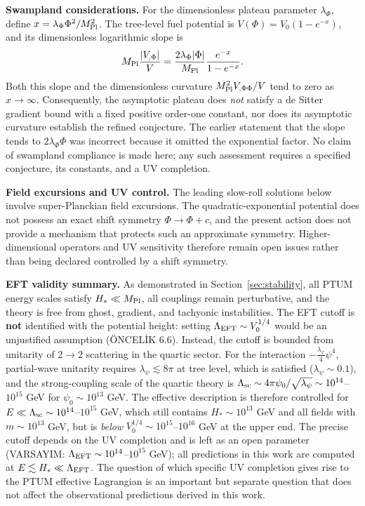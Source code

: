 \documentclass[epj]{svjour}
\begin{document}
\noindent\textbf{Swampland considerations.}
For the dimensionless plateau parameter \(\lambda_\Phi\), define
\(x=\lambda_\Phi\Phi^2/M_{\rm Pl}^2\). The tree-level fuel potential
is \(V(\Phi)=V_0(1-e^{-x})\), and its dimensionless logarithmic slope is
\begin{equation}
M_{\rm Pl}\frac{|V_{,\Phi}|}{V}
=\frac{2\lambda_\Phi|\Phi|}{M_{\rm Pl}}
\frac{e^{-x}}{1-e^{-x}}.
\end{equation}
Both this slope and the dimensionless curvature
\(M_{\rm Pl}^2V_{,\Phi\Phi}/V\) tend to zero as \(x\to\infty\).
Consequently, the asymptotic plateau does \emph{not} satisfy a
de Sitter gradient bound with a fixed positive order-one constant,
nor does its asymptotic curvature establish the refined conjecture.
The earlier statement that the slope tends to
\(2\lambda_\Phi\Phi\) was incorrect because it omitted the
exponential factor. No claim of swampland compliance is made here;
any such assessment requires a specified conjecture, its constants,
and a UV completion.

\noindent\textbf{Field excursions and UV control.}
The leading slow-roll solutions below involve super-Planckian field
excursions. The quadratic-exponential potential does not possess an
exact shift symmetry \(\Phi\to\Phi+c\), and the present action does
not provide a mechanism that protects such an approximate symmetry.
Higher-dimensional operators and UV sensitivity therefore remain
open issues rather than being declared controlled by a shift symmetry.

\noindent\textbf{EFT validity summary.}
As demonstrated in Section~\ref{sec:stability}, all PTUM energy
scales satisfy $H_* \ll M_{\rm Pl}$, all couplings remain
perturbative, and the theory is free from ghost, gradient, and
tachyonic instabilities. The EFT cutoff is \textbf{not}
identified with the potential height: setting
$\Lambda_{\rm EFT}\sim V_0^{1/4}$ would be an unjustified assumption
(ÖNCELİK 6.6). Instead, the cutoff is bounded from unitarity of
$2\to2$ scattering in the quartic sector. For the interaction
$-\frac{\lambda_\psi}{4}\psi^4$, partial-wave unitarity requires
$\lambda_\psi \lesssim 8\pi$ at tree level, which is satisfied
($\lambda_\psi\sim0.1$), and the strong-coupling scale of the quartic
theory is $\Lambda_{\rm sc}\sim 4\pi\psi_0/\sqrt{\lambda_\psi}\sim
10^{14}$--$10^{15}$ GeV for $\psi_0\sim10^{13}$ GeV. The effective
description is therefore controlled for
$E\ll\Lambda_{\rm sc}\sim10^{14}$--$10^{15}$ GeV, which still contains
$H_*\sim10^{13}$ GeV and all fields with $m\sim10^{13}$ GeV, but is
\emph{below} $V_0^{1/4}\sim10^{15}$--$10^{16}$ GeV at the upper end.
The precise cutoff depends on the UV completion and is left as an
open parameter (VARSAYIM: $\Lambda_{\rm EFT}\sim10^{14}$--$10^{15}$ GeV);
all predictions in this work are computed at
$E\lesssim H_*\ll\Lambda_{\rm EFT}$. The question of
which specific UV completion gives rise to the PTUM effective
Lagrangian is an important but separate question that does not
affect the observational predictions derived in this work.
\end{document}
